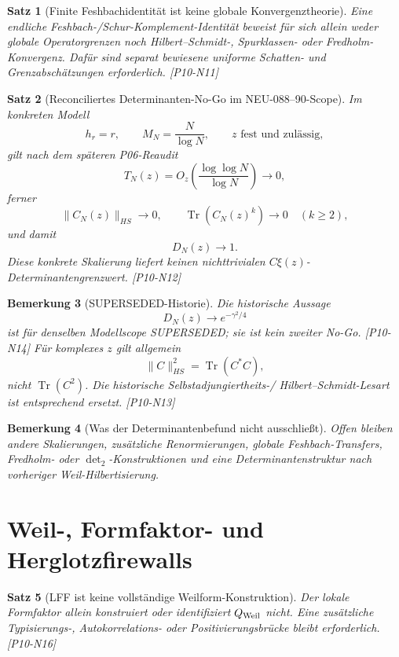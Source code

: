 \documentclass[11pt,a4paper]{amsart}
\newtheorem{theorem}{Satz}[section]
\newtheorem{remark}[theorem]{Bemerkung}
\begin{document}
\begin{theorem}[Finite Feshbachidentität ist keine globale Konvergenztheorie]
\label{thm:n11}
Eine endliche Feshbach-/Schur-Komplement-Identität beweist für sich allein
weder globale Operatorgrenzen noch Hilbert--Schmidt-, Spurklassen- oder
Fredholm-Konvergenz. Dafür sind separat bewiesene uniforme Schatten- und
Grenzabschätzungen erforderlich. \emph{[P10-N11]}
\end{theorem}

\begin{theorem}[Reconciliertes Determinanten-No-Go im NEU-088--90-Scope]
\label{thm:n12}
Im konkreten Modell
\[
  h_r=r,\qquad M_N=\frac{N}{\log N},\qquad z\text{ fest und zulässig},
\]
gilt nach dem späteren P06-Reaudit
\[
  T_N(z)=O_z\!\left(\frac{\log\log N}{\log N}\right)\to0,
\]
ferner
\[
  \|C_N(z)\|_{HS}\to0,
  \qquad
  \operatorname{Tr}(C_N(z)^k)\to0\quad(k\ge2),
\]
und damit
\[
  \boxed{D_N(z)\to1.}
\]
Diese konkrete Skalierung liefert keinen nichttrivialen
$C\xi(z)$-Determinantengrenzwert. \emph{[P10-N12]}
\end{theorem}

\begin{remark}[SUPERSEDED-Historie]\label{rem:n13n14}
Die historische Aussage
\[
  D_N(z)\to e^{-\gamma^2/4}
\]
ist für denselben Modellscope \emph{SUPERSEDED}; sie ist kein zweiter No-Go.
\emph{[P10-N14]} Für komplexes $z$ gilt allgemein
\[
  \|C\|_{HS}^2=\operatorname{Tr}(C^*C),
\]
nicht $\operatorname{Tr}(C^2)$. Die historische Selbstadjungiertheits-/
Hilbert--Schmidt-Lesart ist entsprechend ersetzt. \emph{[P10-N13]}
\end{remark}

\begin{remark}[Was der Determinantenbefund nicht ausschließt]
\label{rem:det-open}
Offen bleiben andere Skalierungen, zusätzliche Renormierungen, globale
Feshbach-Transfers, Fredholm- oder $\det_2$-Konstruktionen und eine
Determinantenstruktur nach vorheriger Weil-Hilbertisierung.
\end{remark}

\section{Weil-, Formfaktor- und Herglotzfirewalls}

\begin{theorem}[LFF ist keine vollständige Weilform-Konstruktion]
\label{thm:n16}
Der lokale Formfaktor allein konstruiert oder identifiziert $Q_{\rm Weil}$
nicht. Eine zusätzliche Typisierungs-, Autokorrelations- oder
Positivierungsbrücke bleibt erforderlich. \emph{[P10-N16]}
\end{theorem}
\end{document}
